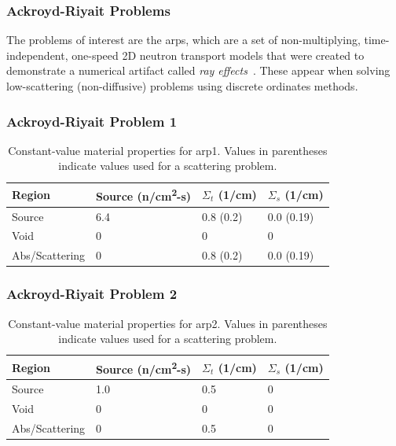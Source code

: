 \begin{frame}
  \frametitle{Ackroyd-Riyait Problems}
  The problems of interest are the \glspl{arp}, which are a set of non-multiplying, time-independent, one-speed 2D neutron transport models that were created to demonstrate a numerical artifact called \textit{ray effects}~\cite{ACKROYD19891}.
  These appear when solving low-scattering (non-diffusive) problems using discrete ordinates methods.

\end{frame}

\begin{frame}
  \frametitle{Ackroyd-Riyait Problem 1}
  
  \begin{table}
    \footnotesize
    \begin{tabular}{llll}
      \toprule
      Region         & Source (n/cm\textsuperscript{2}-s) & $\Sigma_t$ (1/cm) & $\Sigma_s$ (1/cm) \\
      \midrule
      Source         & 6.4                                & 0.8 (0.2)         & 0.0 (0.19)        \\
      Void           & 0                                  & 0                 & 0                 \\
      Abs/Scattering & 0                                  & 0.8 (0.2)         & 0.0 (0.19)        \\
      \bottomrule
    \end{tabular}
    \caption{\footnotesize Constant-value material properties for \gls{arp1}. Values in parentheses indicate values used for a scattering problem.}
    \label{tab:arp1-props}
  \end{table}
\end{frame}

\begin{frame}
  \frametitle{Ackroyd-Riyait Problem 2}
  
  \begin{table}
    \footnotesize
    \begin{tabular}{llll}
      \toprule
      Region         & Source (n/cm\textsuperscript{2}-s) & $\Sigma_t$ (1/cm) & $\Sigma_s$ (1/cm) \\
      \midrule
      Source         & 1.0                                & 0.5               & 0                 \\
      Void           & 0                                  & 0                 & 0                 \\
      Abs/Scattering & 0                                  & 0.5               & 0                 \\
      \bottomrule
    \end{tabular}
    \caption{\footnotesize Constant-value material properties for \gls{arp2}. Values in parentheses indicate values used for a scattering problem.}
    \label{tab:arp2-props}
  \end{table}
\end{frame}


